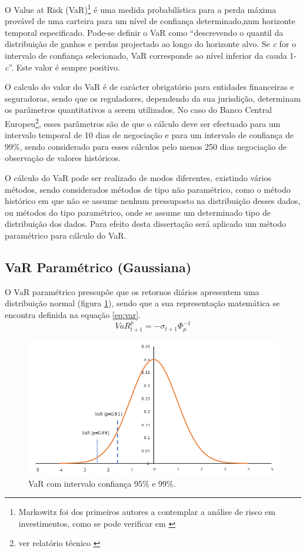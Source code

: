 \documentclass[
  12pt,
  a4paper,
  openany]{book}
\begin{document}
O Value at Risk (VaR)\footnote{Markowitz foi dos primeiros autores a contemplar a análise de risco em investimentos, como se pode verificar em \citet{Markowitz1952}} é uma medida probabilística para a perda máxima provável de uma carteira para um nível de confiança determinado,num horizonte temporal especificado. Pode-se definir o VaR como ``descrevendo o quantil da distribuição de ganhos e perdas projectado ao longo do horizonte alvo. Se \emph{c} for o intervalo de confiança selecionado, VaR corresponde ao nível inferior da cauda 1-\emph{c}''\citep[pp.17]{philippe}. Este valor é sempre positivo.

O calculo do valor do VaR é de carácter obrigatório para entidades financeiras e seguradoras, sendo que os reguladores, dependendo da sua jurisdição, determinam os parâmetros quantitativos a serem utilizados.
No caso do Banco Central Europeu\footnote{ver relatório técnico \citet{ecb}}, esses parâmetros são de que o cálculo deve ser efectuado para um intervalo temporal de 10 dias de negociação e para um intervalo de confiança de 99\%, sendo considerado para esses cálculos pelo menos 250 dias negociação de observação de valores históricos.

O cálculo do VaR pode ser realizado de modos diferentes, existindo vários métodos, sendo considerados métodos de tipo não paramétrico, como o método histórico em que não se assume nenhum pressuposto na distribuição desses dados, ou métodos do tipo paramétrico, onde se assume um determinado tipo de distribuição dos dados. Para efeito desta dissertação será aplicado um método paramétrico para cálculo do VaR.

\hypertarget{var-paramuxe9trico-gaussiana}{%
\subsection{VaR Paramétrico (Gaussiana)}\label{var-paramuxe9trico-gaussiana}}

O VaR paramétrico pressupõe que os retornos diários apresentem uma distribuição normal (figura \ref{fig:var}), sendo que a sua representação matemática se encontra definida na equação \eqref{eq:var}.
\begin{equation} 
  VaR_{t+1}^{p} = -\sigma_{t+1}\Phi_{p}^{-1}
  \label{eq:var}
\end{equation}


\begin{figure}

{\centering \includegraphics[width=0.6\linewidth]{image/VaR} 

}

\caption{VaR com intervalo confiança 95\% e 99\%.}\label{fig:var}
\end{figure}
\FloatBarrier
\centering
\end{document}
